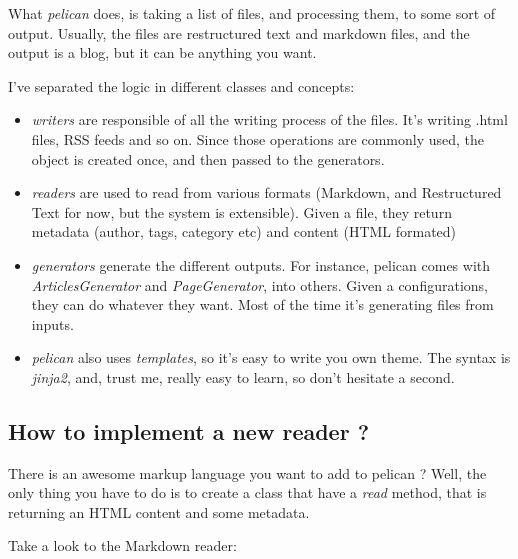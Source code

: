 \documentclass[letterpaper,10pt,english]{manual}
\begin{document}
What \emph{pelican} does, is taking a list of files, and processing them, to some
sort of output. Usually, the files are restructured text and markdown files,
and the output is a blog, but it can be anything you want.

I've separated the logic in different classes and concepts:
\begin{itemize}
\item {} 
\emph{writers} are responsible of all the writing process of the
files. It's writing .html files, RSS feeds and so on. Since those operations
are commonly used, the object is created once, and then passed to the
generators.

\item {} 
\emph{readers} are used to read from various formats (Markdown, and Restructured
Text for now, but the system is extensible). Given a file, they return
metadata (author, tags, category etc) and content (HTML formated)

\item {} 
\emph{generators} generate the different outputs. For instance, pelican comes with
\emph{ArticlesGenerator} and \emph{PageGenerator}, into others. Given
a configurations, they can do whatever they want. Most of the time it's
generating files from inputs.

\item {} 
\emph{pelican} also uses \emph{templates}, so it's easy to write you own theme. The
syntax is \emph{jinja2}, and, trust me, really easy to learn, so don't hesitate
a second.

\end{itemize}


\subsection{How to implement a new reader ?}

There is an awesome markup language you want to add to pelican ?
Well, the only thing you have to do is to create a class that have a \emph{read}
method, that is returning an HTML content and some metadata.

Take a look to the Markdown reader:
\end{document}
